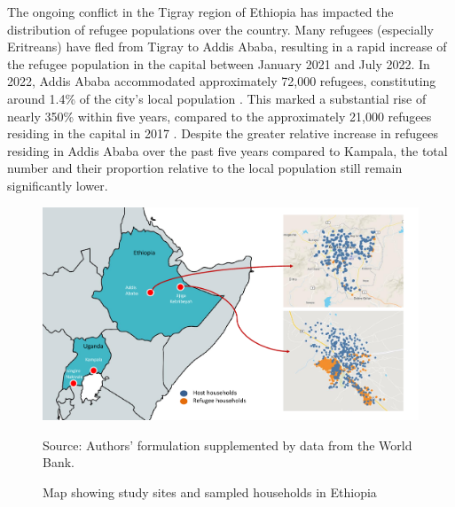 \documentclass[a4paper,12pt]{article}
\renewcommand{\footnotesize}{\fontsize{8pt}{9pt}\selectfont}
\begin{document}
The ongoing conflict in the Tigray region of Ethiopia has impacted the distribution of refugee populations over the country. Many refugees (especially Eritreans) have fled from Tigray to Addis Ababa, resulting in a rapid increase of the refugee population in the capital between January 2021 and July 2022. In 2022, Addis Ababa accommodated approximately 72,000 refugees, constituting around 1.4\% of the city's local population \citep{ethiopiaStatsNov22, WorldPopReviewAddis}. This marked a substantial rise of nearly 350\% within five years, compared to the approximately 21,000 refugees residing in the capital in 2017 \citep{AddisPop17}. Despite the greater relative increase in refugees residing in Addis Ababa over the past five years compared to Kampala, the total number and their proportion relative to the local population still remain significantly lower.


\vspace{5mm}

              \begin{center}
\begin{figure}[H]
	\footnotesize
          \caption{Map showing study sites and sampled households in Ethiopia}
          \label{fig:map_ethiopia}
          \centering
        \includegraphics[height=0.6\textwidth]{Figures/FIG3_Map_Ethiopia.pdf} \\
        \begin{minipage}{0.65\textwidth}
 { \footnotesize Source: Authors' formulation supplemented by data from the World Bank. \par}
\end{minipage}
\vspace{5mm}
 \end{figure} 
   \end{center}
\end{document}
